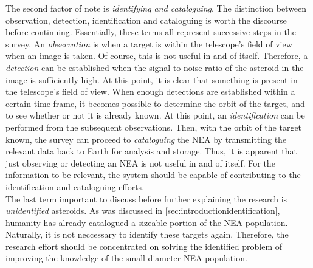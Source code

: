 The second factor of note is \textit{identifying and cataloguing}. The distinction between observation, detection, identification and cataloguing is worth the discourse before continuing. Essentially, these terms all represent successive steps in the survey. An \textit{observation} is when a target is within the telescope's field of view when an image is taken. Of course, this is not useful in and of itself. Therefore, a \textit{detection} can be established when the signal-to-noise ratio of the asteroid in the image is sufficiently high. At this point, it is clear that something is present in the telescope's field of view. When enough detections are established within a certain time frame, it becomes possible to determine the orbit of the target, and to see whether or not it is already known. At this point, an \textit{identification} can be performed from the subsequent observations. Then, with the orbit of the target known, the survey can proceed to \textit{cataloguing} the NEA by transmitting the relevant data back to Earth for analysis and storage. Thus, it is apparent that just observing or detecting an NEA is not useful in and of itself. For the information to be relevant, the system should be capable of contributing to the identification and cataloguing efforts. \\

The last term important to discuss before further explaining the research is \textit{unidentified} asteroids. As was discussed in \autoref{sec:introductionidentification}, humanity has already catalogued a sizeable portion of the NEA population. Naturally, it is not neccessary to identify these targets again. Therefore, the research effort should be concentrated on solving the identified problem of improving the knowledge of the small-diameter NEA population. \\

